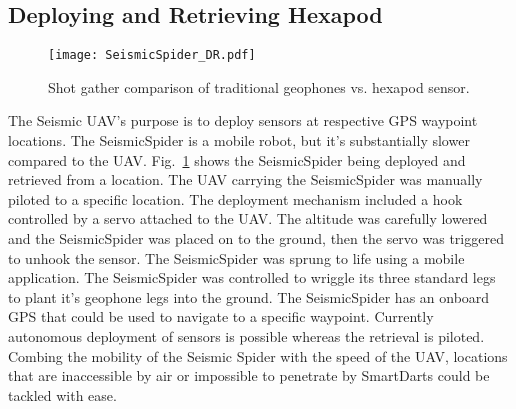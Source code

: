 \subsection{Deploying and Retrieving Hexapod}
\begin{figure} \centering
  {\texttt{[image: SeismicSpider\_DR.pdf]}}
 \caption{Shot gather comparison of traditional geophones vs. hexapod sensor. 
 \label{fig:SeismicSpider_DR}}
\end{figure}
The Seismic UAV’s purpose is to deploy sensors at respective GPS waypoint locations. The SeismicSpider is a mobile robot, but it’s substantially slower compared to the UAV. Fig.~\ref{fig:SeismicSpider_DR} shows the SeismicSpider being deployed and retrieved from a location. The UAV carrying the SeismicSpider was manually piloted to a specific location. The deployment mechanism included a hook controlled by a servo attached to the UAV. The altitude was carefully lowered and the SeismicSpider was placed on to the ground, then the servo was triggered to unhook the sensor.  The SeismicSpider was sprung to life using a mobile application. The SeismicSpider was controlled to wriggle its three standard legs to plant it’s  geophone legs into the ground.  The SeismicSpider has an onboard GPS that could be used to navigate to a specific waypoint.  Currently autonomous deployment of sensors is possible whereas the retrieval is piloted. Combing the mobility of the Seismic Spider with the speed of the UAV, locations that are inaccessible by air or impossible to penetrate by SmartDarts could be tackled with ease.

